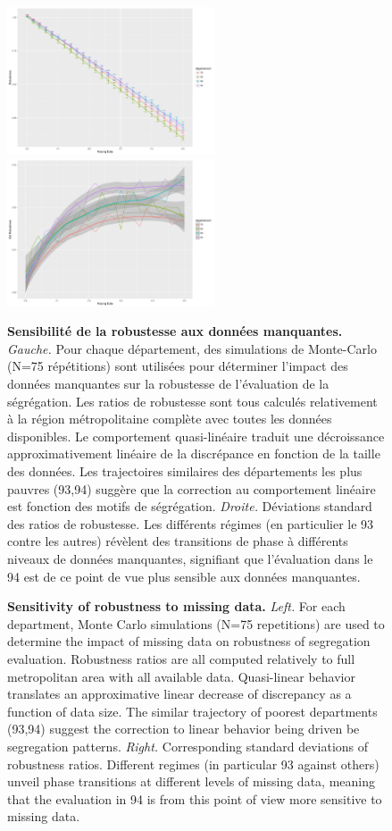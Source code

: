 \begin{figure}
\centering
\hspace{-2cm}\includegraphics[width=0.55\textwidth]{Figures/RobustnessDiscrepancy/alldeps_rob_renormindics.pdf}
\includegraphics[width=0.55\textwidth]{Figures/RobustnessDiscrepancy/alldeps_robsd_renormindics.pdf}\hspace{-2cm}
\caption{\textbf{Sensitivity of robustness to missing data.} \textit{Left.} For each department, Monte Carlo simulations (N=75 repetitions) are used to determine the impact of missing data on robustness of segregation evaluation. Robustness ratios are all computed relatively to full metropolitan area with all available data. Quasi-linear behavior translates an approximative linear decrease of discrepancy as a function of data size. The similar trajectory of poorest departments (93,94) suggest the correction to linear behavior being driven be segregation patterns. \textit{Right.} Corresponding standard deviations of robustness ratios. Different regimes (in particular 93 against others) unveil phase transitions at different levels of missing data, meaning that the evaluation in 94 is from this point of view more sensitive to missing data.}{\textbf{Sensibilité de la robustesse aux données manquantes.} \textit{Gauche.} Pour chaque département, des simulations de Monte-Carlo (N=75 répétitions) sont utilisées pour déterminer l'impact des données manquantes sur la robustesse de l'évaluation de la ségrégation. Les ratios de robustesse sont tous calculés relativement à la région métropolitaine complète avec toutes les données disponibles. Le comportement quasi-linéaire traduit une décroissance approximativement linéaire de la discrépance en fonction de la taille des données. Les trajectoires similaires des départements les plus pauvres (93,94) suggère que la correction au comportement linéaire est fonction des motifs de ségrégation. \textit{Droite.} Déviations standard des ratios de robustesse. Les différents régimes (en particulier le 93 contre les autres) révèlent des transitions de phase à différents niveaux de données manquantes, signifiant que l'évaluation dans le 94 est de ce point de vue plus sensible aux données manquantes.}

\end{figure}
